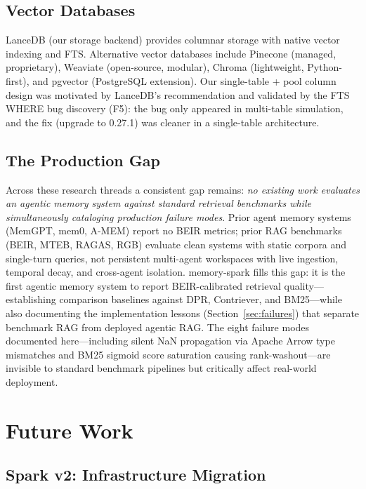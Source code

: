 \documentclass[11pt]{article}
\begin{document}
\subsection{Vector Databases}

LanceDB (our storage backend) provides columnar storage with native vector indexing and
FTS. Alternative vector databases include Pinecone (managed, proprietary), Weaviate
(open-source, modular), Chroma (lightweight, Python-first), and pgvector (PostgreSQL
extension). Our single-table + pool column design was motivated by LanceDB's recommendation
and validated by the FTS WHERE bug discovery (F5): the bug only appeared in multi-table
simulation, and the fix (upgrade to 0.27.1) was cleaner in a single-table architecture.

\subsection{The Production Gap}

Across these research threads a consistent gap remains: \emph{no existing work evaluates an
agentic memory system against standard retrieval benchmarks while simultaneously cataloging
production failure modes}. Prior agent memory systems (MemGPT, mem0, A-MEM) report no BEIR
metrics; prior RAG benchmarks (BEIR, MTEB, RAGAS, RGB) evaluate clean systems with static
corpora and single-turn queries, not persistent multi-agent workspaces with live ingestion,
temporal decay, and cross-agent isolation. memory-spark fills this gap: it is the first agentic
memory system to report BEIR-calibrated retrieval quality---establishing comparison baselines
against DPR, Contriever, and BM25---while also documenting the implementation lessons (Section~\ref{sec:failures}) that separate
benchmark RAG from deployed agentic RAG. The eight failure modes documented here---including
silent NaN propagation via Apache Arrow type mismatches and BM25 sigmoid score saturation
causing rank-washout---are invisible to standard benchmark pipelines but critically affect
real-world deployment.

\section{Future Work}
\label{sec:future}

\subsection{Spark v2: Infrastructure Migration}
\label{sec:future:sparkv2}
\end{document}
